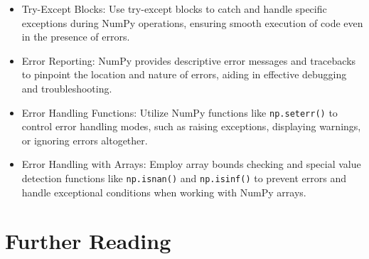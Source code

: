 \begin{itemize}
	\item Try-Except Blocks: Use try-except blocks to catch and handle specific
	exceptions during NumPy operations, ensuring smooth execution of code even in
	the presence of errors.
	
	\item Error Reporting: NumPy provides descriptive error messages and
	tracebacks to pinpoint the location and nature of errors, aiding in effective
	debugging and troubleshooting.
	
	\item Error Handling Functions: Utilize NumPy functions like \texttt{np.seterr()}
	to control error handling modes, such as raising exceptions, displaying warnings,
	or ignoring errors altogether.
	
	\item Error Handling with Arrays: Employ array bounds checking and special
	value detection functions like \texttt{np.isnan()} and \texttt{np.isinf()}
	to prevent errors and handle exceptional conditions when working with NumPy
	arrays.
\end{itemize}

\section{Further Reading}

